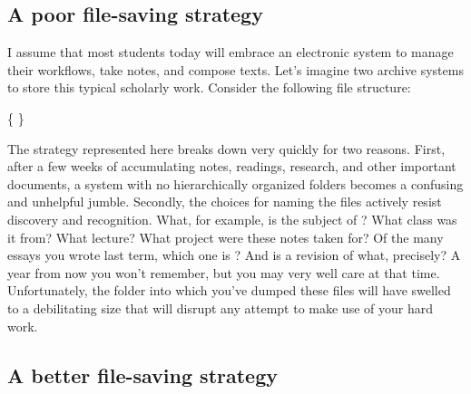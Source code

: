 \subsection{A poor file-saving strategy}

I assume that most students today will embrace an electronic system to manage their workflows, take notes, and compose texts. Let's imagine two archive systems to store this typical scholarly work. Consider the following file structure:

\medskip

{\large
{}  
}
 
\begin{center} \{  \} \end{center}

\noindent The strategy represented here breaks down very quickly for two reasons. First, after a few weeks of accumulating notes, readings, research, and other important documents, a system with no hierarchically organized folders becomes a confusing and unhelpful jumble. Secondly, the choices for naming the files actively resist discovery and recognition. What, for example, is the subject of ? What class was it from? What lecture? What project were these notes taken for? Of the many essays you wrote last term, which one is ? And  is a revision of what, precisely? A year from now you won't remember, but you may very well care at that time. Unfortunately, the folder into which you've dumped these files will have swelled to a debilitating size that will disrupt any attempt to make use of your hard work. 

\subsection{A better file-saving strategy}

